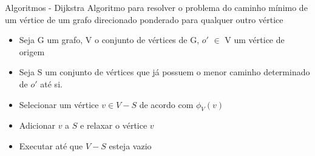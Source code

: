 \begin{frame}{Algoritmos - Dijkstra}
    Algoritmo para resolver o problema do caminho mínimo de um vértice de um grafo direcionado ponderado para qualquer outro vértice \cite{cormen2022introduction}
    \vspace{\baselineskip}
    \begin{itemize}
        \item Seja G um grafo, V o conjunto de vértices de G, $o'$ $\in$ V um vértice de origem
        \item Seja S um conjunto de vértices que já possuem o menor caminho determinado de $o'$ até si.
        \item Selecionar um vértice $v \in V-S$ de acordo com $\phi_V(v)$
        \item Adicionar $v$ a $S$ e relaxar o vértice $v$
        \item Executar até que $V-S$ esteja vazio
    \end{itemize}
\end{frame}